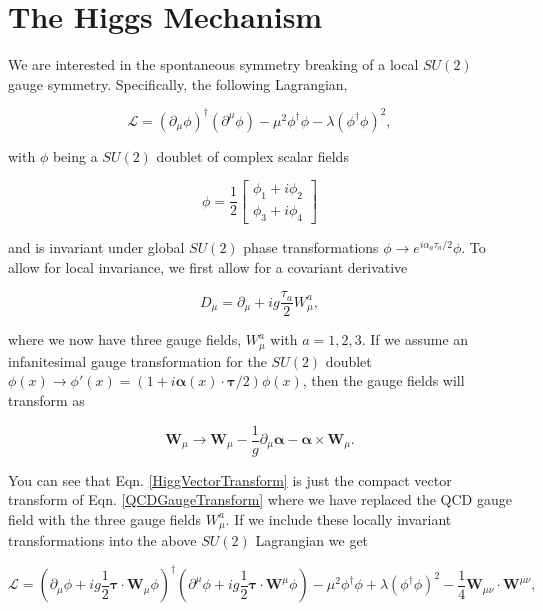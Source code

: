 \section{The Higgs Mechanism}

We are interested in the spontaneous symmetry breaking of a local $SU(2)$ gauge symmetry. Specifically, the following Lagrangian,

\begin{equation}\label{HiggsLagrangian}
\mathcal{L}=(\partial_\mu\phi)^\dagger(\partial^\mu\phi)-\mu^2\phi^\dagger\phi-\lambda(\phi^\dagger\phi)^2,
\end{equation}

with $\phi$ being a $SU(2)$ doublet of complex scalar fields

\begin{equation}
\phi=\frac{1}{2}
\begin{bmatrix}
\phi_1+i\phi_2 \\
\phi_3+i\phi_4
\end{bmatrix}
\end{equation} 

and is invariant under global $SU(2)$ phase transformations $\phi\rightarrow e^{i\alpha_a\tau_a/2}\phi$. To allow for local invariance, we first allow for a covariant derivative

\begin{equation}
D_\mu=\partial_\mu+ig\frac{\tau_a}{2}W_\mu^a,
\end{equation}

where we now have three gauge fields, $W_\mu^a$ with $a=1,2,3$. If we assume an infanitesimal gauge transformation for the $SU(2)$ doublet $\phi(x)\rightarrow\phi'(x)=(1 +i\boldsymbol{\alpha}(x)\cdot\boldsymbol{\tau}/2)\phi(x)$, then the gauge fields will transform as

\begin{equation}\label{HiggVectorTransform}
\boldsymbol{W}_\mu\rightarrow\boldsymbol{W}_\mu-\frac{1}{g}\partial_\mu\boldsymbol{\alpha}-\boldsymbol{\alpha}\times\boldsymbol{W}_\mu.
\end{equation}

You can see that Eqn. \ref{HiggVectorTransform} is just the compact vector transform of Eqn. \ref{QCDGaugeTransform} where we have replaced the QCD gauge field with the three gauge fields $W_\mu^a$. If we include these locally invariant transformations into the above $SU(2)$ Lagrangian we get

\begin{equation}\label{HiggsInvariantL}
\mathcal{L}=(\partial_\mu\phi+ig\frac{1}{2}\boldsymbol{\tau}\cdot\boldsymbol{W}_\mu\phi)^\dagger(\partial^\mu\phi+ig\frac{1}{2}\boldsymbol{\tau}\cdot\boldsymbol{W}^\mu\phi)-\mu^2\phi^\dagger\phi+\lambda(\phi^\dagger\phi)^2-\frac{1}{4}\boldsymbol{W}_{\mu\nu}\cdot\boldsymbol{W}^{\mu\nu},
\end{equation}

